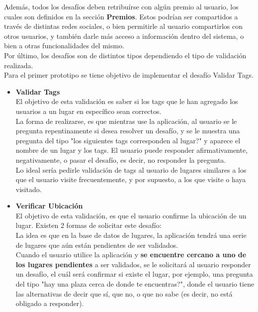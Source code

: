 \documentclass[10pt,letterpaper]{article}
\begin{document}
Además, todos los desafíos deben retribuírse con algún premio al usuario, los cuales son definidos en la sección \textbf{Premios}. Estos podrían ser compartidos a través de distintas redes sociales, o bien permitirle al usuario compartirlos con otros usuarios, y también darle más acceso a información dentro del sistema, o bien a otras funcionalidades del mismo.\\

Por último, los desafíos son de distintos tipos dependiendo el tipo de validación realizada.\\

Para el primer prototipo se tiene objetivo de implementar el desafío Validar Tags.\\

\begin{itemize}
 \item \textbf{Validar Tags} \\

El objetivo de esta validación es saber si los tags que le han agregado los usuarios a un lugar en específico sean correctos.\\

La forma de realizarse, es que mientras use la aplicación, al usuario se le pregunta repentinamente si desea resolver un desafío, y se le muestra una pregunta del tipo "los siguientes tags corresponden al lugar?" y aparece el nombre de un lugar y los tags. El usuario puede responder afirmativamente, negativamente, o pasar el desafío, es decir, no responder la pregunta.\\

Lo ideal sería pedirle validación de tags al usuario de lugares similares a los que el usuario visite frecuentemente, y por supuesto, a los que visite o haya visitado.\\

 \item \textbf{Verificar Ubicación} \\

El objetivo de esta validación, es que el usuario confirme la ubicación de un lugar. Existen 2 formas de solicitar este desafío:\\

La idea es que en la base de datos de lugares, la aplicación tendrá una serie de lugares que aún están pendientes de ser validados.\\

Cuando el usuario utilice la aplicación y \textbf{se encuentre cercano a uno de los lugares pendientes} a ser validados, se le solicitará al usuario responder un desafío, el cuál será confirmar si existe el lugar, por ejemplo, una pregunta del tipo "hay una plaza cerca de donde te encuentras?", donde el usuario tiene las alternativas de decir que sí, que no, o que no sabe (es decir, no está obligado a responder).\\


\end{itemize}
\end{document}
